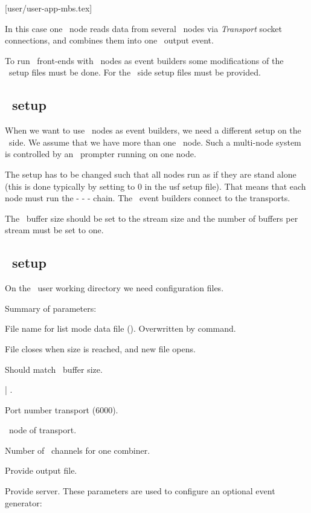 [user/user-app-mbs.tex]
\label{user-app-mbs-chapter}


In this case one \dabc\ node reads data from several
\mbs\ nodes via {\em Transport} socket connections, and combines them
into one \mbs\ output event. 

To run \mbs\ front-ends with \dabc\ nodes as event builders some
modifications of the \mbs\ setup files must be done.
For the \dabc\ side setup files must be provided.

\subsection[MBS setup]{\mbs\ setup}
When we want to use \dabc\ nodes as event builders, we need a different
setup on the \mbs\ side. We assume that we have more than one
\mbs\ node. Such a multi-node system is controlled by an \mbs\ prompter running on one node.
\bbul
\item The setup has to be changed such that all nodes run as if they are stand alone
(this is done typically by setting  to 0 in the usf setup file).
That means that each node must run the  -  - 
 - 
chain. The \dabc\ event builders connect to the transports.
\item The \mbs\ buffer size should be set to the stream size and the number of buffers per
stream must be set to one.
\ebul

\subsection[DABC setup]{\dabc\ setup}
On the \dabc\ user working directory we need configuration files.

Summary of parameters:
\bdes
\item[FileName] File name for list mode data file (). Overwritten by command.
\item[FileSizeLimit] File closes when size is reached, and new file opens.
\item[BufferSize] Should match \mbs\ buffer size.
\item[MbsServerKind]  | .
\item[MbsServerPort] Port number transport (6000).
\item[MbsServerName] \mbs\ node of transport.
\item[NumInputs] Number of \mbs\ channels for one combiner.
\item[DoFile] Provide output file.
\item[DoServer] Provide server.
\edes
These parameters are used to configure an optional event generator:
\bdes
\item[NumSubevents]
\item[FirstProcId]
\item[SubeventSize]
\item[Go4Random]
\edes
{}


